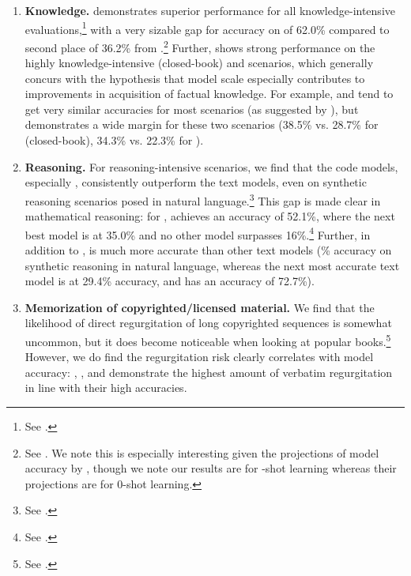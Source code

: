 \begin{enumerate}
    \item \textbf{Knowledge.}
    \instructdavinci demonstrates superior performance for all knowledge-intensive evaluations,\footnote{See .} with a very sizable gap for accuracy on \truthfulqa of 62.0\% compared to second place of 36.2\% from \anthropic.\footnote{See .    
    We note this is especially interesting given the projections of model accuracy by \citet{evans2022truthfulqa}, though we note our results are for \numincontext-shot learning whereas their projections are for 0-shot learning.}
    Further, \mtnlgfivethreezero shows strong performance on the highly knowledge-intensive \naturalquestions (closed-book) and \wikifact scenarios, which generally concurs with the hypothesis that model scale especially contributes to improvements in acquisition of factual knowledge.
    For example, \anthropic and \mtnlgfivethreezero tend to get very similar accuracies for most scenarios (as suggested by ), but \mtnlgfivethreezero demonstrates a wide margin for these two scenarios (38.5\% vs. 28.7\% for \naturalquestions (closed-book), 34.3\% vs. 22.3\% for \wikifact). 
    
    \item \textbf{Reasoning.}
    For reasoning-intensive scenarios, we find that the code models, especially \davincicodex, consistently outperform the text models, even on synthetic reasoning scenarios posed in natural language.\footnote{See .}
    This gap is made clear in mathematical reasoning: for \gsm, \davincicodex achieves an accuracy of 52.1\%, where the next best model is \instructdavinci at 35.0\% and no other model surpasses 16\%.\footnote{See .} 
    Further, in addition to \davincicodex, \instructdavinci is much more accurate than other text models (\% accuracy on synthetic reasoning in natural language, whereas the next most accurate text model is \optonesevenfive at 29.4\% accuracy, and \davincicodex has an accuracy of 72.7\%). 
    
    \item \textbf{Memorization of copyrighted/licensed material.}
    We find that the likelihood of direct regurgitation of long copyrighted sequences is somewhat uncommon, but it does become noticeable when looking at popular books.\footnote{See .}
    However, we do find the regurgitation risk clearly correlates with model accuracy: \instructdavinci, \gptdavinci, and \anthropic demonstrate the highest amount of verbatim regurgitation in line with their high accuracies. 
    

\end{enumerate}
